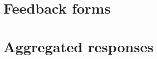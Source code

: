 \documentclass[bsc,frontabs,twoside,singlespacing,deptreport]{infthesis}
\begin{document}


\appendix
\chapter{Feedback forms}


\chapter{Aggregated responses}


\end{document}
